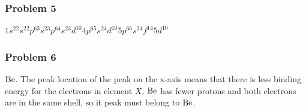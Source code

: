 \documentclass{article}
\begin{document}
\subsubsection*{Problem 5}
\(1s^22s^22p^63s^23p^64s^23d^{10}4p^65s^24d^{10}5p^66s^24f^{14}5d^{10}\)
\subsubsection*{Problem 6}
\(\ce{Be}\). The peak location of the peak on the x-axis means that there is less binding energy for the electrons in element \(X\). \(\ce{Be}\) has fewer protons
and both electrons are in the same shell, so it peak must belong to \(\ce{Be}\).
\end{document}
